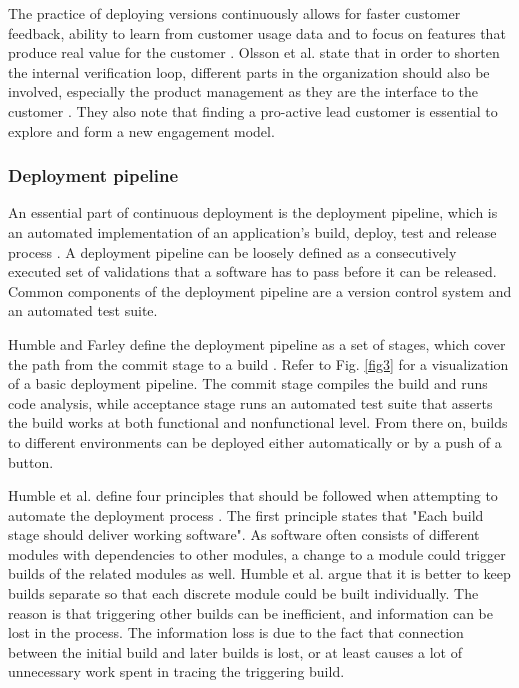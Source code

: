 \documentclass[english, grading]{tktltiki2}
\theoremstyle{definition}
\theoremstyle{remark}
\begin{document}
The practice of deploying versions continuously allows for faster customer feedback, ability to learn from customer usage data and to focus on features that produce real value for the customer \cite{olsson2012climbing}. Olsson et al. state that in order to shorten the internal verification loop, different parts in the organization should also be involved, especially the product management as they are the interface to the customer \cite{olsson2012climbing}. They also note that finding a pro-active lead customer is essential to explore and form a new engagement model.

\subsubsection{Deployment pipeline}
An essential part of continuous deployment is the deployment pipeline, which is an automated implementation of an application's build, deploy, test and release process \cite{cdbook}. A deployment pipeline can be loosely defined as a consecutively executed set of validations that a software has to pass before it can be released. Common components of the deployment pipeline are a version control system and an automated test suite.

Humble and Farley define the deployment pipeline as a set of stages, which cover the path from the commit stage to a build \cite{cdbook}. Refer to Fig. \ref{fig3} for a visualization of a basic deployment pipeline. The commit stage compiles the build and runs code analysis, while acceptance stage runs an automated test suite that asserts the build works at both functional and nonfunctional level. From there on, builds to different environments can be deployed either automatically or by a push of a button.

Humble et al. define four principles that should be followed when attempting to automate the deployment process \cite{humble2006deployment}. The first principle states that "Each build stage should deliver working software". As software often consists of different modules with dependencies to other modules, a change to a module could trigger builds of the related modules as well. Humble et al. argue that it is better to keep builds separate so that each discrete module could be built individually. The reason is that triggering other builds can be inefficient, and information can be lost in the process. The information loss is due to the fact that connection between the initial build and later builds is lost, or at least causes a lot of unnecessary work spent in tracing the triggering build. 
\end{document}
